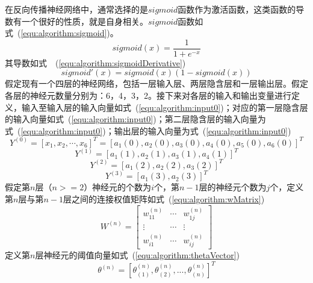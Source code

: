 在反向传播神经网络中，通常选择的是$sigmoid$函数作为激活函数，这类函数的导数有一个很好的性质，就是自身相关。$sigmoid$函数如式~(\ref{equ:algorithm:sigmoid})。
\begin{equation}
\label{equ:algorithm:sigmoid}
sigmoid(x) = \frac{1}{1+e^{-x}}
\end{equation}
其导数如式~~(\ref{equ:algorithm:sigmoidDerivative})
\begin{equation}
\label{equ:algorithm:sigmoidDerivative}
sigmoid'(x) = sigmoid(x)(1-sigmoid(x))
\end{equation}
假定现有一个四层的神经网络，包括一层输入层、两层隐含层和一层输出层。假定各层的神经元数量分别为：6，4，3，2。接下来对各层的输入和输出变量进行定义，输入至输入层的输入向量如式~(\ref{equ:algorithm:input0})；对应的第一层隐含层的输入向量如式~(\ref{equ:algorithm:input0})；第二层隐含层的输入向量为式~(\ref{equ:algorithm:input0})；输出层的输入向量为式~(\ref{equ:algorithm:input0})\cite{BPNNPrincipleY}
\begin{equation}
\label{equ:algorithm:input0}
Y^{(0)} = [x_1,x_2,\cdots,x_6]^T =[a_1(0),a_2(0),a_3(0),a_4(0),a_5(0),a_6(0)]^T
\end{equation}
\begin{equation}
\label{equ:algorithm:input1}
Y^{(1)} = [a_1(1),a_2(1),a_3(1),a_4(1)]^T 
\end{equation}
\begin{equation}
\label{equ:algorithm:input2}
Y^{(2)} = [a_1(2),a_2(2),a_3(2)]^T
\end{equation}
\begin{equation}
\label{equ:algorithm:input3}
Y^{(3)} = [a_1(3),a_2(3)]^T
\end{equation}
假定第$n$层（$n>=2$）神经元的个数为$i$个，第$n-1$层的神经元个数为$j$个，定义第$n$层与第$n-1$层之间的连接权值矩阵如式~(\ref{equ:algorithm:wMatrix})
\begin{equation}
\label{equ:algorithm:wMatrix}
W^{(n)}=\begin{bmatrix}
w_{11}^{(n)} & \cdots & w_{1j}^{(n)} \\
\vdots & \cdots & \vdots \\
w_{i1}^{(n)}& \cdots & w_{ij}^{(n)}
\end{bmatrix}
\end{equation}
定义第$n$层神经元的阈值向量如式~(\ref{equ:algorithm:thetaVector})
\begin{equation}
\label{equ:algorithm:thetaVector}
\theta^{(n)} = [\theta^{(n)}_{(1)},\theta^{(n)}_{(2)},...,\theta^{(n)}_{(n)}]^T 
\end{equation}
